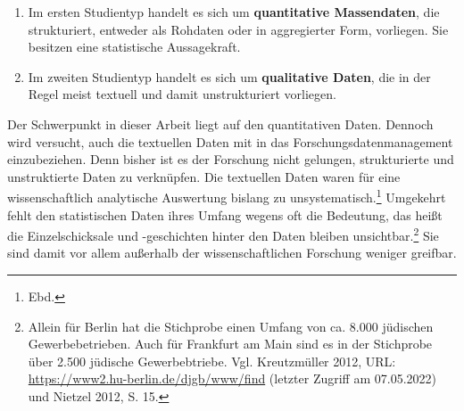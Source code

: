 \begin{enumerate}
    \item Im ersten Studientyp handelt es sich um \textbf{quantitative Massendaten}, die strukturiert, entweder als Rohdaten oder in aggregierter Form, vorliegen. Sie besitzen eine statistische Aussagekraft.
    \item Im zweiten Studientyp handelt es sich um \textbf{qualitative Daten}, die in der Regel meist textuell und damit unstrukturiert vorliegen.
\end{enumerate}

Der Schwerpunkt in dieser Arbeit liegt auf den quantitativen Daten. Dennoch wird versucht, auch die textuellen Daten mit in das Forschungsdatenmanagement einzubeziehen. Denn bisher ist es der Forschung nicht gelungen, strukturierte und unstruktierte Daten zu verknüpfen. Die textuellen Daten waren für eine wissenschaftlich analytische Auswertung bislang zu unsystematisch.\footnote{Ebd.} Umgekehrt fehlt den statistischen Daten ihres Umfang wegens oft die Bedeutung, das heißt die Einzelschicksale und -geschichten hinter den Daten bleiben unsichtbar.\footnote{Allein für Berlin hat die Stichprobe einen Umfang von ca. 8.000 jüdischen Gewerbebetrieben. Auch für Frankfurt am Main sind es in der Stichprobe über 2.500 jüdische Gewerbebtriebe. Vgl. Kreutzmüller 2012, URL: \url{https://www2.hu-berlin.de/djgb/www/find} (letzter Zugriff am 07.05.2022) und Nietzel 2012, S. 15.} Sie sind damit vor allem außerhalb der wissenschaftlichen Forschung weniger greifbar.

